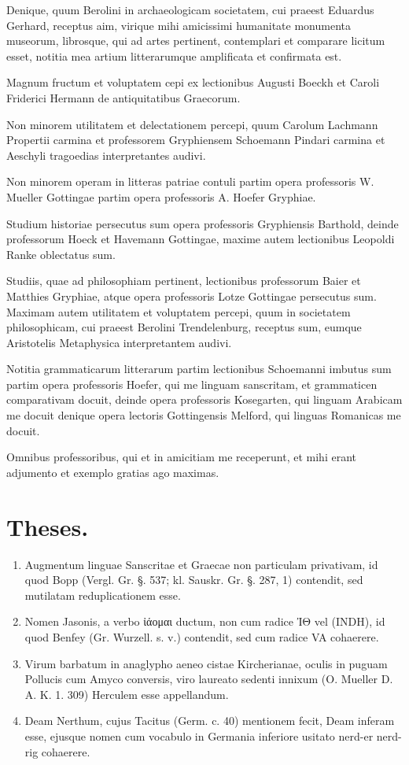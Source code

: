 \documentclass[a4paper, 11pt, oneside, polutonikogreek, german]{article}
\begin{document}
Denique, quum Berolini in archaeologicam societatem, cui praeest Eduardus Gerhard, receptus aim, virique mihi amicissimi humanitate monumenta museorum, librosque, qui ad artes pertinent, contemplari et comparare licitum esset, notitia mea artium litterarumque amplificata et confirmata est.

Magnum fructum et voluptatem cepi ex lectionibus Augusti Boeckh et Caroli Friderici Hermann de antiquitatibus Graecorum.

Non minorem utilitatem et delectationem percepi, quum Carolum Lachmann Propertii carmina et professorem Gryphiensem Schoemann Pindari carmina et Aeschyli tragoedias interpretantes audivi.

Non minorem operam in litteras patriae contuli partim opera professoris W. Mueller Gottingae partim opera professoris A. Hoefer Gryphiae.

Studium historiae persecutus sum opera professoris Gryphiensis Barthold, deinde professorum Hoeck et Havemann Gottingae, maxime autem lectionibus Leopoldi Ranke oblectatus sum.

Studiis, quae ad philosophiam pertinent, lectionibus professorum Baier et Matthies Gryphiae, atque opera professoris Lotze Gottingae persecutus sum. Maximam autem utilitatem et voluptatem percepi, quum in societatem philosophicam, cui praeest Berolini Trendelenburg, receptus sum, eumque Aristotelis Metaphysica interpretantem audivi.

Notitia grammaticarum litterarum partim lectionibus Schoemanni imbutus sum partim opera professoris Hoefer, qui me linguam sanscritam, et grammaticen comparativam docuit, deinde opera professoris Kosegarten, qui linguam Arabicam me docuit denique opera lectoris Gottingensis Melford, qui linguas Romanicas me docuit.

Omnibus professoribus, qui et in amicitiam me receperunt, et mihi erant adjumento et exemplo gratias ago maximas.
\clearpage
\section{Theses.}
\begin{enumerate}
    \item Augmentum linguae Sanscritae et Graecae non particulam privativam, id quod Bopp (Vergl. Gr. §. 537; kl. Sauskr. Gr. §. 287, 1) contendit, sed mutilatam reduplicationem esse.
    \item Nomen Jasonis, a verbo ἰάομαι ductum, non cum radice ἸΘ vel (INDH), id quod Benfey (Gr. Wurzell. s. v.) contendit, sed cum radice VA cohaerere.
    \item Virum barbatum in anaglypho aeneo cistae Kircherianae, oculis in puguam Pollucis cum Amyco conversis, viro laureato sedenti innixum (O. Mueller D. A. K. 1. 309) Herculem esse appellandum.
    \item Deam Nerthum, cujus Tacitus (Germ. c. 40) mentionem fecit, Deam inferam esse, ejusque nomen cum vocabulo in Germania inferiore usitato nerd-er nerd-rig cohaerere.
\end{enumerate}
\clearpage
\end{document}
